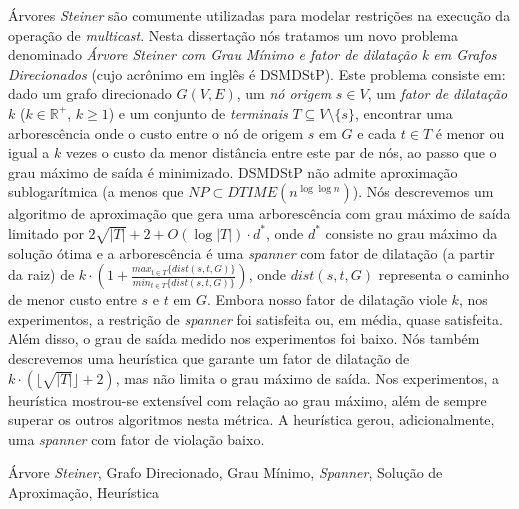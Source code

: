 \resumo
\'Arvores \emph{Steiner} s\~ao comumente utilizadas para modelar restri\c{c}\~oes na execu\c{c}\~ao da opera\c{c}\~ao de \emph{multicast}. Nesta disserta\c{c}\~ao n\'os tratamos um novo problema denominado 
\emph{\'Arvore Steiner com Grau M\'inimo e fator de dilata\c{c}\~ao k em Grafos Direcionados} (cujo acr\^onimo em ingl\^es \'e DSMDStP). Este problema consiste em: 
dado um grafo direcionado $G(V,E)$, um \emph{n\'o origem} $s \in V$, um \emph{fator de dilata\c{c}\~ao} $k$ ($k \in \mathbb{R}^+$, $k \ge 1$) e um conjunto de \emph{terminais} $T \subseteq V \setminus \lbrace s \rbrace$, 
encontrar uma arboresc\^encia onde o custo entre o n\'o de origem $s$ em $G$ e cada $t \in T$ \'e menor ou igual a $k$ vezes o custo da menor dist\^ancia entre este par de n\'os, 
ao passo que o grau m\'aximo de sa\'ida \'e minimizado. DSMDStP n\~ao admite aproxima\c{c}\~ao sublogar\'itmica (a menos que $NP \subset DTIME(n^{\log \log{n}})$). N\'os descrevemos um algoritmo de aproxima\c{c}\~ao 
que gera uma arboresc\^encia com grau m\'aximo de sa\'ida limitado por $2\sqrt{|T|} + 2 + O(\log |T|) \cdot d^*$, onde $d^*$ consiste no grau m\'aximo da solu\c{c}\~ao \'otima e a arboresc\^encia 
\'e uma \emph{spanner} com fator de dilata\c{c}\~ao (a partir da raiz) de $k \cdot \left(1 + \frac{max_{t\in T}\{dist(s,t,G)\}}{min_{t \in T}\{dist(s,t,G)\}}\right)$, 
onde $dist(s,t,G)$ representa o caminho de menor custo entre $s$ e $t$ em $G$. Embora nosso fator de dilata\c{c}\~ao 
viole $k$, nos experimentos, a restri\c{c}\~ao de \emph{spanner} foi satisfeita ou, em m\'edia, quase satisfeita. Al\'em disso, o grau de sa\'ida medido nos experimentos foi baixo. 
N\'os tamb\'em descrevemos uma heur\'istica que garante um fator de dilata\c{c}\~ao de $k \cdot (\lfloor\sqrt{|T|}\rfloor+2)$, mas n\~ao limita o grau m\'aximo de sa\'ida. Nos experimentos, a heur\'istica 
mostrou-se extens\'ivel com rela\c{c}\~ao ao grau m\'aximo, al\'em de sempre superar os outros algoritmos nesta m\'etrica. A heur\'istica gerou, adicionalmente, uma \emph{spanner} com fator de viola\c{c}\~ao baixo.
\begin{keywords}
\'Arvore \emph{Steiner}, Grafo Direcionado, Grau M\'inimo, \emph{Spanner}, Solu\c{c}\~ao de Aproxima\c{c}\~ao, Heur\'istica
\end{keywords}

